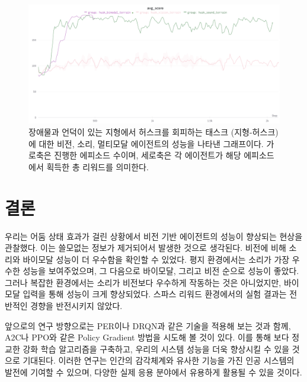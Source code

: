 \documentclass[oneside, under, ko]{snuthesis}
\begin{document}
\begin{figure}
    \centering
    \includegraphics[width=\textwidth]{husk_terrain.png}
    \caption{장애물과 언덕이 있는 지형에서 허스크를 회피하는 태스크 (지형-허스크)에 대한 비전, 소리, 멀티모달 에이전트의 성능을 나타낸 그래프이다. 가로축은 진행한 에피소드 수이며, 세로축은 각 에이전트가 해당 에피소드에서 획득한 총 리워드를 의미한다.}
    \label{fig:husk_terrain}
\end{figure}

\chapter{결론}\label{chp:conclusion}

우리는 어둠 상태 효과가 걸린 상황에서 비전 기반 에이전트의 성능이 향상되는 현상을 관찰했다. 이는 쓸모없는 정보가 제거되어서 발생한 것으로 생각된다. 비전에 비해 소리와 바이모달 성능이 더 우수함을 확인할 수 있었다. 평지 환경에서는 소리가 가장 우수한 성능을 보여주었으며, 그 다음으로 바이모달, 그리고 비전 순으로 성능이 좋았다. 그러나 복잡한 환경에서는 소리가 비전보다 우수하게 작동하는 것은 아니었지만, 바이모달 입력을 통해 성능이 크게 향상되었다. 스파스 리워드 환경에서의 실험 결과는 전반적인 경향을 반전시키지 않았다.

앞으로의 연구 방향으로는 PER이나 DRQN과 같은 기술을 적용해 보는 것과 함께, A2C나 PPO와 같은 Policy Gradient 방법을 시도해 볼 것이 있다. 이를 통해 보다 정교한 강화 학습 알고리즘을 구축하고, 우리의 시스템 성능을 더욱 향상시킬 수 있을 것으로 기대된다. 이러한 연구는 인간의 감각체계와 유사한 기능을 가진 인공 시스템의 발전에 기여할 수 있으며, 다양한 실제 응용 분야에서 유용하게 활용될 수 있을 것이다.
\end{document}
